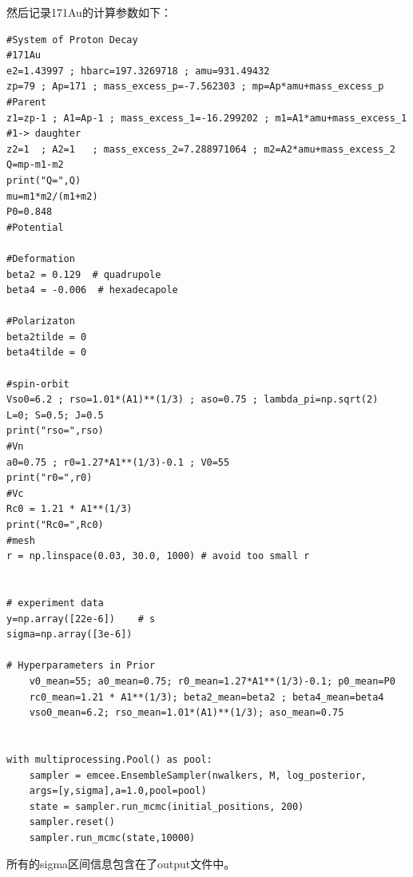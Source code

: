 \documentclass[11pt,a4paper,UTF8,scheme=plain,fontset=fandol]{ctexbook}
\theoremstyle{definition}
\theoremstyle{plain}
\theoremstyle{remark}
\begin{document}
然后记录171Au的计算参数如下：
\begin{verbatim}
#System of Proton Decay
#171Au
e2=1.43997 ; hbarc=197.3269718 ; amu=931.49432
zp=79 ; Ap=171 ; mass_excess_p=-7.562303 ; mp=Ap*amu+mass_excess_p        #Parent
z1=zp-1 ; A1=Ap-1 ; mass_excess_1=-16.299202 ; m1=A1*amu+mass_excess_1    #1-> daughter
z2=1  ; A2=1   ; mass_excess_2=7.288971064 ; m2=A2*amu+mass_excess_2
Q=mp-m1-m2
print("Q=",Q)
mu=m1*m2/(m1+m2)
P0=0.848
#Potential

#Deformation
beta2 = 0.129  # quadrupole
beta4 = -0.006  # hexadecapole 

#Polarizaton
beta2tilde = 0  
beta4tilde = 0

#spin-orbit
Vso0=6.2 ; rso=1.01*(A1)**(1/3) ; aso=0.75 ; lambda_pi=np.sqrt(2)
L=0; S=0.5; J=0.5
print("rso=",rso)
#Vn
a0=0.75 ; r0=1.27*A1**(1/3)-0.1 ; V0=55
print("r0=",r0)
#Vc
Rc0 = 1.21 * A1**(1/3)          
print("Rc0=",Rc0)
#mesh
r = np.linspace(0.03, 30.0, 1000) # avoid too small r


# experiment data
y=np.array([22e-6])    # s
sigma=np.array([3e-6])

# Hyperparameters in Prior
    v0_mean=55; a0_mean=0.75; r0_mean=1.27*A1**(1/3)-0.1; p0_mean=P0
    rc0_mean=1.21 * A1**(1/3); beta2_mean=beta2 ; beta4_mean=beta4
    vso0_mean=6.2; rso_mean=1.01*(A1)**(1/3); aso_mean=0.75
    

with multiprocessing.Pool() as pool:
    sampler = emcee.EnsembleSampler(nwalkers, M, log_posterior, 
    args=[y,sigma],a=1.0,pool=pool)
    state = sampler.run_mcmc(initial_positions, 200)
    sampler.reset()
    sampler.run_mcmc(state,10000)
\end{verbatim}

所有的sigma区间信息包含在了output文件中。
\end{document}
